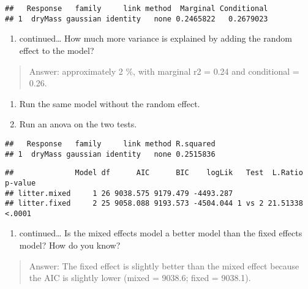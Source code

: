 \documentclass[
]{article}
\providecommand{\tightlist}{%
  \setlength{\itemsep}{0pt}\setlength{\parskip}{0pt}}
\begin{document}
\begin{verbatim}
##   Response   family     link method  Marginal Conditional
## 1  dryMass gaussian identity   none 0.2465822   0.2679023
\end{verbatim}

\begin{enumerate}
\def\labelenumi{\alph{enumi}.}
\setcounter{enumi}{1}
\tightlist
\item
  continued\ldots{} How much more variance is explained by adding the
  random effect to the model?
\end{enumerate}

\begin{quote}
Answer: approximately 2 \%, with marginal r2 = 0.24 and conditional =
0.26.
\end{quote}

\begin{enumerate}
\def\labelenumi{\alph{enumi}.}
\setcounter{enumi}{2}
\tightlist
\item
  Run the same model without the random effect.
\item
  Run an anova on the two tests.
\end{enumerate}

\begin{verbatim}
##   Response   family     link method R.squared
## 1  dryMass gaussian identity   none 0.2515836
\end{verbatim}

\begin{verbatim}
##              Model df      AIC      BIC    logLik   Test  L.Ratio p-value
## litter.mixed     1 26 9038.575 9179.479 -4493.287                        
## litter.fixed     2 25 9058.088 9193.573 -4504.044 1 vs 2 21.51338  <.0001
\end{verbatim}

\begin{enumerate}
\def\labelenumi{\alph{enumi}.}
\setcounter{enumi}{3}
\tightlist
\item
  continued\ldots{} Is the mixed effects model a better model than the
  fixed effects model? How do you know?
\end{enumerate}

\begin{quote}
Answer: The fixed effect is slightly better than the mixed effect
because the AIC is slightly lower (mixed = 9038.6; fixed = 9038.1).
\end{quote}
\end{document}
